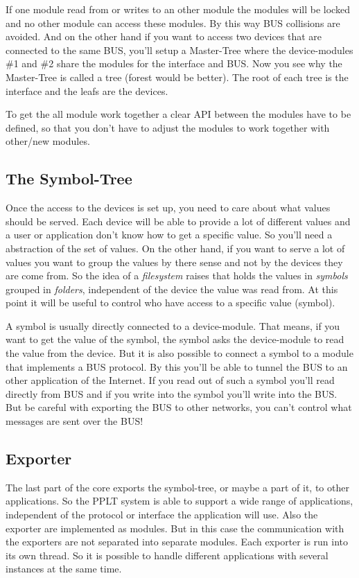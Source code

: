If one module read from or writes to an other module the modules
will be locked and no other module can access these modules. By this way 
BUS collisions are avoided. And on the other hand if you want to access
two devices that are connected to the same BUS, you'll setup a 
Master-Tree where the device-modules \#1 and \#2 share the modules for the 
interface and BUS. Now you see why the Master-Tree is called a tree (forest 
would be better). The root of each tree is the interface and the leafs are 
the devices.

To get the all module work together a clear API between the modules have
to be defined, so that you don't have to adjust the modules to work together
with other/new modules. 

\subsection{The Symbol-Tree}
Once the access to the devices is set up, you need to care about what values 
should be served. Each device will be able to provide a lot of different values
and a user or application don't know how to get a specific value. So you'll 
need a abstraction of the set of values. On the other hand, if you want to 
serve a lot of values you want to group the values by there sense and not by the
devices they are come from. So the idea of a \textit{filesystem} raises that holds 
the values in \textit{symbols} grouped in \textit{folders}, independent of the 
device the value was read from. At this point it will be useful to control
who have access to a specific value (symbol). 

A symbol is usually directly connected to a device-module. That means, if you 
want to get the value of the symbol, the symbol asks the device-module to read
the value from the device. But it is also possible to connect a symbol to a
module that implements a BUS protocol. By this you'll be able to tunnel the 
BUS to an other application of the Internet. If you read out of such a symbol
you'll read directly from BUS and if you write into the symbol you'll write 
into the BUS. But be careful with exporting the BUS to other networks, you
can't control what messages are sent over the BUS!


\subsection{Exporter}
The last part of the core exports the symbol-tree, or maybe a part of it, to
other applications. So the PPLT system is able to support a wide range of 
applications, independent of the protocol or interface the application
will use. Also the exporter are implemented as modules. But in this case
the communication with the exporters are not separated into separate modules.
Each exporter is run into its own thread. So it is possible to handle
different applications with several instances at the same time. 


